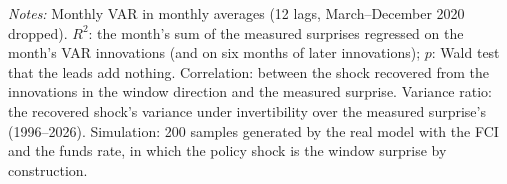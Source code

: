 \begin{table}[tp]\centering\scriptsize
\caption{Can a Monthly VAR Recover the Window Surprise?}\label{tab:decompdiag}
\begin{flushleft}\footnotesize\textit{Notes:} Monthly VAR in monthly averages (12 lags, March--December 2020 dropped). $R^2$: the month's sum of the measured surprises regressed on the month's VAR innovations (and on six months of later innovations); $p$: Wald test that the leads add nothing. Correlation: between the shock recovered from the innovations in the window direction and the measured surprise. Variance ratio: the recovered shock's variance under invertibility over the measured surprise's (1996--2026). Simulation: 200 samples generated by the real model with the FCI and the funds rate, in which the policy shock is the window surprise by construction.\end{flushleft}
\end{table}
